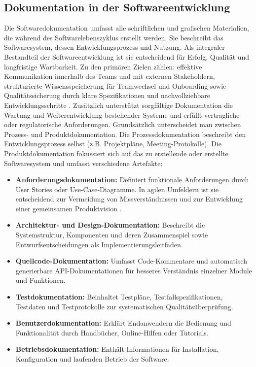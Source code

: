 \documentclass[12pt,oneside]{article}
\begin{document}
    \subsection{Dokumentation in der Softwareentwicklung}
    \label{subsec:dokumentation}
    Die Softwaredokumentation umfasst alle schriftlichen und grafischen Materialien, die während des Softwarelebenszyklus erstellt werden. Sie beschreibt das Softwaresystem, dessen Entwicklungsprozess und Nutzung.
    Als integraler Bestandteil der Softwareentwicklung ist sie entscheidend für Erfolg, Qualität und langfristige Wartbarkeit.
    Zu den primären Zielen zählen: effektive Kommunikation innerhalb des Teams und mit externen Stakeholdern, strukturierte Wissensspeicherung für Teamwechsel und Onboarding sowie Qualitätssicherung durch klare Spezifikationen und nachvollziehbare Entwicklungsschritte \cite{webmakers2024}.
    Zusätzlich unterstützt sorgfältige Dokumentation die Wartung und Weiterentwicklung bestehender Systeme und erfüllt vertragliche oder regulatorische Anforderungen.
    \newline
    Grundsätzlich unterscheidet man zwischen Prozess- und Produktdokumentation. Die Prozessdokumentation beschreibt den Entwicklungsprozess selbst (z.B. Projektpläne, Meeting-Protokolle). Die Produktdokumentation fokussiert sich auf das zu erstellende oder erstellte Softwaresystem und umfasst verschiedene Artefakte:
    \begin{itemize}
        \item \textbf{Anforderungsdokumentation:} Definiert funktionale Anforderungen durch User Stories oder Use-Case-Diagramme. In agilen Umfeldern ist sie entscheidend zur Vermeidung von Missverständnissen und zur Entwicklung einer gemeinsamen Produktvision \cite{fraunhoferIESE2020}.
        \item \textbf{Architektur- und Design-Dokumentation:} Beschreibt die Systemstruktur, Komponenten und deren Zusammenspiel sowie Entwurfsentscheidungen als Implementierungsleitfaden.
        \item \textbf{Quellcode-Dokumentation:} Umfasst Code-Kommentare und automatisch generierbare API-Dokumentationen für besseres Verständnis einzelner Module und Funktionen.
        \item \textbf{Testdokumentation:} Beinhaltet Testpläne, Testfallspezifikationen, Testdaten und Testprotokolle zur systematischen Qualitätsüberprüfung.
        \item \textbf{Benutzerdokumentation:} Erklärt Endanwendern die Bedienung und Funktionalität durch Handbücher, Online-Hilfen oder Tutorials.
        \item \textbf{Betriebsdokumentation:} Enthält Informationen für Installation, Konfiguration und laufenden Betrieb der Software.
    \end{itemize}
\end{document}
